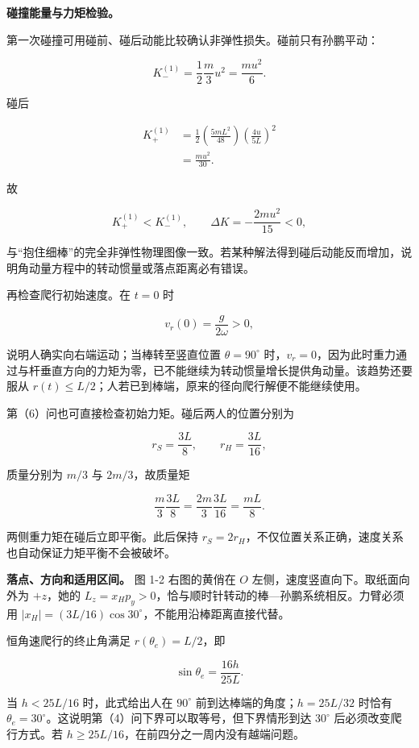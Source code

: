 \documentclass[12pt,a4paper,UTF8]{ctexart}
\begin{document}
\textbf{碰撞能量与力矩检验。}

第一次碰撞可用碰前、碰后动能比较确认非弹性损失。碰前只有孙鹏平动：

\[K_-^{(1)}=\frac12\frac m3u^2=\frac{mu^2}{6}.\]

碰后

\[
\begin{aligned}
K_+^{(1)}
&=\frac12\left(\frac{5mL^2}{48}\right)
\left(\frac{4u}{5L}\right)^2\\
&=\frac{mu^2}{30}.
\end{aligned}
\]

故

\[K_+^{(1)}<K_-^{(1)},\qquad
\Delta K=-\frac{2mu^2}{15}<0,\]

与``抱住细棒''的完全非弹性物理图像一致。若某种解法得到碰后动能反而增加，说明角动量方程中的转动惯量或落点距离必有错误。

再检查爬行初始速度。在 \(t=0\) 时

\[v_r(0)=\frac{g}{2\omega}>0,\]

说明人确实向右端运动；当棒转至竖直位置 \(\theta=90^\circ\)
时，\(v_r=0\)，因为此时重力通过与杆垂直方向的力矩为零，已不能继续为转动惯量增长提供角动量。该趋势还要服从
\(r(t)\le L/2\)；人若已到棒端，原来的径向爬行解便不能继续使用。

第（6）问也可直接检查初始力矩。碰后两人的位置分别为

\[r_S=\frac{3L}{8},\qquad r_H=\frac{3L}{16},\]

质量分别为 \(m/3\) 与 \(2m/3\)，故质量矩

\[\frac m3\frac{3L}{8}=\frac{2m}{3}\frac{3L}{16}=\frac{mL}{8}.\]

两侧重力矩在碰后立即平衡。此后保持
\(r_S=2r_H\)，不仅位置关系正确，速度关系也自动保证力矩平衡不会被破坏。

\textbf{落点、方向和适用区间。} 图 1-2 右图的黄俏在 \(O\)
左侧，速度竖直向下。取纸面向外为 \(+z\)，她的
\(L_z=x_Hp_y>0\)，恰与顺时针转动的棒---孙鹏系统相反。力臂必须用
\(|x_H|=(3L/16)\cos30^\circ\)，不能用沿棒距离直接代替。

恒角速爬行的终止角满足 \(r(\theta_e)=L/2\)，即

\[\sin\theta_e=\frac{16h}{25L}.\]

当 \(h<25L/16\) 时，此式给出人在 \(90^\circ\)
前到达棒端的角度；\(h=25L/32\) 时恰有
\(\theta_e=30^\circ\)。这说明第（4）问下界可以取等号，但下界情形到达
\(30^\circ\) 后必须改变爬行方式。若
\(h\ge25L/16\)，在前四分之一周内没有越端问题。

\newpage
\end{document}

